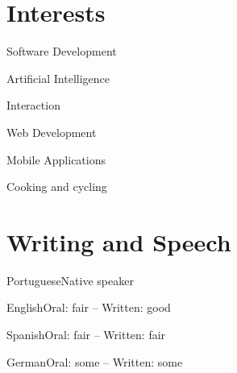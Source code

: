 \documentclass{tccv}
\begin{document}
\section{Interests}
\begin{factlist}
    \item{}{Software Development}
    \item{}{Artificial Intelligence}
    \item{}{Interaction}
    \item{}{Web Development}
    \item{}{Mobile Applications}
    \item{}{Cooking and cycling}
\end{factlist}

\section{Writing and Speech}
\begin{factlist}
\item{Portuguese}{Native speaker}
\item{English}{Oral: fair -- Written: good}
\item{Spanish}{Oral: fair -- Written: fair}
\item{German}{Oral: some -- Written: some}
\end{factlist}
\end{document}
